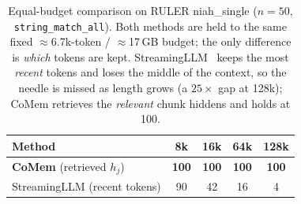\begin{table}[t]
\centering
\small
\begin{tabular}{@{}lcccc@{}}
\toprule
\textbf{Method} & 8k & 16k & 64k & 128k \\
\midrule
\textbf{CoMem} (retrieved $h_j$) & \textbf{100} & \textbf{100} & \textbf{100} & \textbf{100} \\
StreamingLLM (recent tokens) & 90 & 42 & 16 & 4 \\
\bottomrule
\end{tabular}
\caption{Equal-budget comparison on RULER niah\_single ($n{=}50$,
\texttt{string\_match\_all}). Both methods are held to the same fixed
$\approx$6.7k-token / $\approx$17\,GB budget; the only difference is
\emph{which} tokens are kept. StreamingLLM~\citep{streamingllm} keeps the most
\emph{recent} tokens and loses the middle of the context, so the needle is
missed as length grows (a $25\times$ gap at 128k); CoMem retrieves the
\emph{relevant} chunk hiddens and holds at 100.}
\label{tab:slm}
\end{table}
